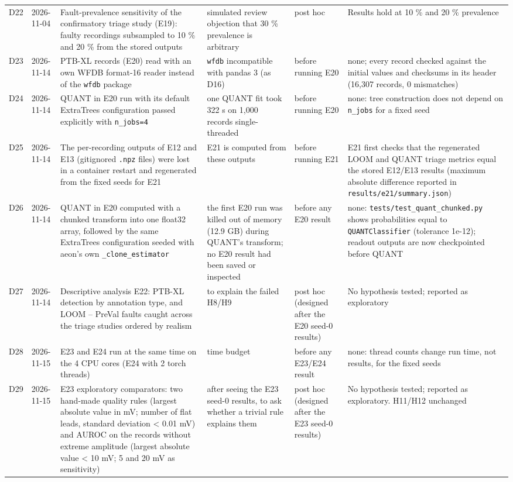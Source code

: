 \begin{longtable}{P{0.65cm}P{1.5cm}P{4.2cm}P{3.2cm}P{1.8cm}P{3.0cm}}
$$D22 & 2026-11-04 & Fault-prevalence sensitivity of the confirmatory triage study (E19): faulty recordings subsampled to 10 \% and 20 \% from the stored outputs & simulated review objection that 30 \% prevalence is arbitrary & post hoc & Results hold at 10 \% and 20 \% prevalence \\
D23 & 2026-11-14 & PTB-XL records (E20) read with an own WFDB format-16 reader instead of the \texttt{wfdb} package & \texttt{wfdb} incompatible with pandas 3 (as D16) & before running E20 & none; every record checked against the initial values and checksums in its header (16,307 records, 0 mismatches) \\
D24 & 2026-11-14 & QUANT in E20 run with its default ExtraTrees configuration passed explicitly with \texttt{n\_\allowbreak{}jobs=4} & one QUANT fit took 322 s on 1,000 records single-threaded & before running E20 & none: tree construction does not depend on \texttt{n\_\allowbreak{}jobs} for a fixed seed \\
D25 & 2026-11-14 & The per-recording outputs of E12 and E13 (gitignored \texttt{.\allowbreak{}npz} files) were lost in a container restart and regenerated from the fixed seeds for E21 & E21 is computed from these outputs & before running E21 & E21 first checks that the regenerated LOOM and QUANT triage metrics equal the stored E12/E13 results (maximum absolute difference reported in \texttt{results/\allowbreak{}e21/\allowbreak{}summary.\allowbreak{}json}) \\
D26 & 2026-11-14 & QUANT in E20 computed with a chunked transform into one float32 array, followed by the same ExtraTrees configuration seeded with aeon's own \texttt{\_\allowbreak{}clone\_\allowbreak{}estimator} & the first E20 run was killed out of memory (12.9 GB) during QUANT's transform; no E20 result had been saved or inspected & before any E20 result & none: \texttt{tests/\allowbreak{}test\_\allowbreak{}quant\_\allowbreak{}chunked.\allowbreak{}py} shows probabilities equal to \texttt{QUANTClassifier} (tolerance 1e-12); readout outputs are now checkpointed before QUANT \\
D27 & 2026-11-14 & Descriptive analysis E22: PTB-XL detection by annotation type, and LOOM -- PreVal faults caught across the triage studies ordered by realism & to explain the failed H8/H9 & post hoc (designed after the E20 seed-0 results) & No hypothesis tested; reported as exploratory \\
D28 & 2026-11-15 & E23 and E24 run at the same time on the 4 CPU cores (E24 with 2 torch threads) & time budget & before any E23/E24 result & none: thread counts change run time, not results, for the fixed seeds \\
D29 & 2026-11-15 & E23 exploratory comparators: two hand-made quality rules (largest absolute value in mV; number of flat leads, standard deviation < 0.01 mV) and AUROC on the records without extreme amplitude (largest absolute value < 10 mV; 5 and 20 mV as sensitivity) & after seeing the E23 seed-0 results, to ask whether a trivial rule explains them & post hoc (designed after the E23 seed-0 results) & No hypothesis tested; reported as exploratory. H11/H12 unchanged \\
\bottomrule
\end{longtable}
